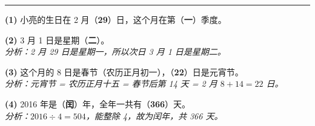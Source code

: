 \vspace{0.5cm}

\vspace{0.8cm}
\hrule
\vspace{0.5cm}

{\small
\textbf{(1)} 小亮的生日在 2 月（\textbf{29}）日，这个月在第（\textbf{一}）季度。

\vspace{0.3cm}
\textbf{(2)} 3 月 1 日是星期（\textbf{二}）。\\
\textit{分析：2 月 29 日是星期一，所以次日 3 月 1 日是星期二。}

\vspace{0.3cm}
\textbf{(3)} 这个月的 8 日是春节（农历正月初一），（\textbf{22}）日是元宵节。\\
\textit{分析：元宵节 = 农历正月十五 = 春节后第 14 天 = 2 月 $8 + 14 = 22$ 日。}

\vspace{0.3cm}
\textbf{(4)} 2016 年是（\textbf{闰}）年，全年一共有（\textbf{366}）天。\\
\textit{分析：$2016 \div 4 = 504$，能整除 4，故为闰年，共 366 天。}
}


